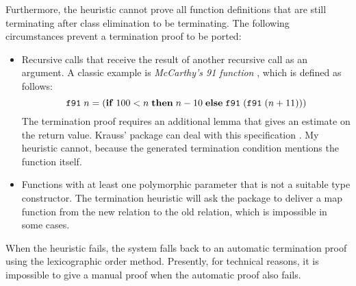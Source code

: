 Furthermore, the heuristic cannot prove all function definitions that are still terminating after class elimination to be terminating.
The following circumstances prevent a termination proof to be ported:
\begin{itemize}
  \item
    Recursive calls that receive the result of another recursive call as an argument.
    A classic example is \emph{McCarthy's 91 function} \cite{manna1970properties}, which is defined as follows:
      \[ \texttt{\textup{f91}}\;n = (\mathtt{\mathbf{if}}\; 100 < n\; \mathtt{\mathbf{then}}\; n - 10 \;\mathtt{\mathbf{else}}\; \texttt{\textup{f91}}\; (\texttt{\textup{f91}}\; (n + 11))) \]
    The termination proof requires an additional lemma that gives an estimate on the return value.
    Krauss'  package can deal with this specification \cite[§2.7.2]{krauss2009fun}.
    My heuristic cannot, because the generated termination condition mentions the function itself.
  \item
    Functions with at least one polymorphic parameter that is not a suitable type constructor.
    The termination heuristic will ask the  package to deliver a map function from the new relation to the old relation, which is impossible in some cases.
\end{itemize}

\noindent
When the heuristic fails, the system falls back to an automatic termination proof using the lexicographic order method.
Presently, for technical reasons, it is impossible to give a manual proof when the automatic proof also fails.
